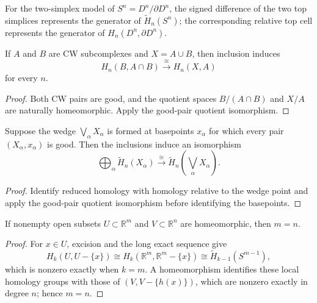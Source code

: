 \begin{example}
\label{ex:cycles-spheres-disks}

For the two-simplex model of $S^n=D^n/\partial D^n$, the signed difference of the two top simplices represents the generator of $\widetilde H_n(S^n)$; the corresponding relative top cell represents the generator of $H_n(D^n,\partial D^n)$.
\end{example}

\begin{corollary}
\label{cor:excision-cw-subcomplexes}

If $A$ and $B$ are CW subcomplexes and $X=A\cup B$, then inclusion induces
\[
H_n(B,A\cap B)\xrightarrow{\cong}H_n(X,A)
\]
for every $n$.
\end{corollary}

\begin{proof}
\sketch Both CW pairs are good, and the quotient spaces
$B/(A\cap B)$ and $X/A$ are naturally homeomorphic. Apply the good-pair
quotient isomorphism.
\end{proof}

\begin{corollary}
\label{cor:wedge-sum-direct-sum-homology}

Suppose the wedge $\bigvee_\alpha X_\alpha$ is formed at basepoints
$x_\alpha$ for which every pair $(X_\alpha,x_\alpha)$ is good. Then the
inclusions induce an isomorphism
\[
\bigoplus_\alpha\widetilde H_n(X_\alpha)
\xrightarrow{\cong}
\widetilde H_n\left(\bigvee_\alpha X_\alpha\right).
\]
\end{corollary}

\begin{proof}
\sketch Identify reduced homology with homology relative to the wedge point and
apply the good-pair quotient isomorphism before identifying the basepoints.
\end{proof}

\begin{theorem}
\label{thm:invariance-of-dimension}

If nonempty open subsets $U\subset\mathbb{R}^m$ and
$V\subset\mathbb{R}^n$ are homeomorphic, then $m=n$.
\end{theorem}
\begin{proof}
\sketch For $x\in U$, excision and the long exact sequence give
\[
H_k(U,U-\{x\})\cong H_k(\mathbb{R}^m,\mathbb{R}^m-\{x\})
\cong\widetilde H_{k-1}(S^{m-1}),
\]
which is nonzero exactly when $k=m$. A homeomorphism identifies these local
homology groups with those of $(V,V-\{h(x)\})$, which are nonzero exactly in
degree $n$; hence $m=n$.
\end{proof}


